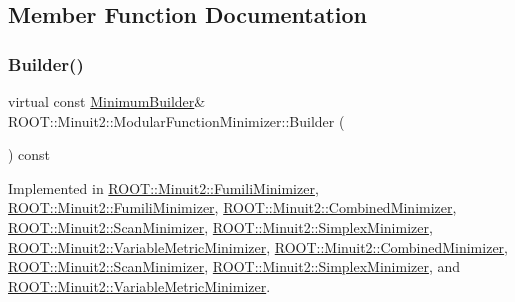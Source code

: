 \subsection{Member Function Documentation}
\mbox{\label{classROOT_1_1Minuit2_1_1ModularFunctionMinimizer_a13e98551cf14e927c61e1e34ecf8ba8b}} 
\subsubsection{\texorpdfstring{Builder()}{Builder()}\hspace{0.1cm}{\footnotesize\ttfamily [1/2]}}
{\footnotesize\ttfamily virtual const \mbox{\hyperlink{classROOT_1_1Minuit2_1_1MinimumBuilder}{Minimum\+Builder}}\& R\+O\+O\+T\+::\+Minuit2\+::\+Modular\+Function\+Minimizer\+::\+Builder (\begin{DoxyParamCaption}{ }\end{DoxyParamCaption}) const\hspace{0.3cm}{\ttfamily [pure virtual]}}



Implemented in \mbox{\hyperlink{classROOT_1_1Minuit2_1_1FumiliMinimizer_a24d20e7cd4a335f60616fd7cafe0739c}{R\+O\+O\+T\+::\+Minuit2\+::\+Fumili\+Minimizer}}, \mbox{\hyperlink{classROOT_1_1Minuit2_1_1FumiliMinimizer_a24d20e7cd4a335f60616fd7cafe0739c}{R\+O\+O\+T\+::\+Minuit2\+::\+Fumili\+Minimizer}}, \mbox{\hyperlink{classROOT_1_1Minuit2_1_1CombinedMinimizer_a73befc9c0bdfe8c9f09638505772c5ed}{R\+O\+O\+T\+::\+Minuit2\+::\+Combined\+Minimizer}}, \mbox{\hyperlink{classROOT_1_1Minuit2_1_1ScanMinimizer_a6ca4b63ec20ed8dd310e02d427ef05fa}{R\+O\+O\+T\+::\+Minuit2\+::\+Scan\+Minimizer}}, \mbox{\hyperlink{classROOT_1_1Minuit2_1_1SimplexMinimizer_a388494c3f9b45ce6c5d91decef737608}{R\+O\+O\+T\+::\+Minuit2\+::\+Simplex\+Minimizer}}, \mbox{\hyperlink{classROOT_1_1Minuit2_1_1VariableMetricMinimizer_aa31a52e431960a91acf0b9c2997b397b}{R\+O\+O\+T\+::\+Minuit2\+::\+Variable\+Metric\+Minimizer}}, \mbox{\hyperlink{classROOT_1_1Minuit2_1_1CombinedMinimizer_a73befc9c0bdfe8c9f09638505772c5ed}{R\+O\+O\+T\+::\+Minuit2\+::\+Combined\+Minimizer}}, \mbox{\hyperlink{classROOT_1_1Minuit2_1_1ScanMinimizer_a6ca4b63ec20ed8dd310e02d427ef05fa}{R\+O\+O\+T\+::\+Minuit2\+::\+Scan\+Minimizer}}, \mbox{\hyperlink{classROOT_1_1Minuit2_1_1SimplexMinimizer_a388494c3f9b45ce6c5d91decef737608}{R\+O\+O\+T\+::\+Minuit2\+::\+Simplex\+Minimizer}}, and \mbox{\hyperlink{classROOT_1_1Minuit2_1_1VariableMetricMinimizer_aa31a52e431960a91acf0b9c2997b397b}{R\+O\+O\+T\+::\+Minuit2\+::\+Variable\+Metric\+Minimizer}}.

